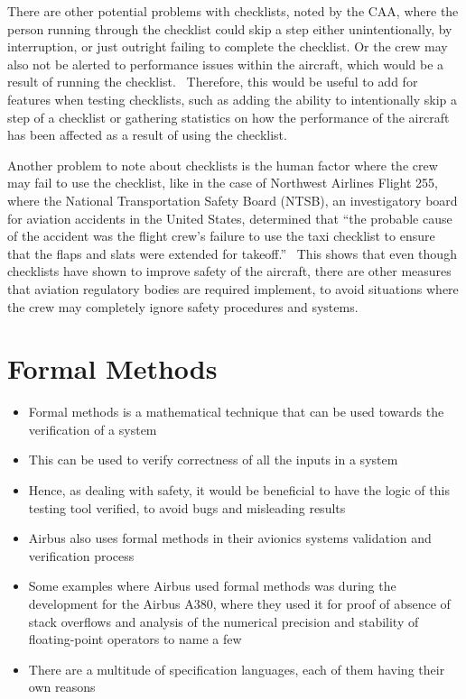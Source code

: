 \documentclass[../dissertation.tex]{subfiles}
\begin{document}
There are other potential problems with checklists,
noted by the CAA, where the person running through the checklist could skip a step
either unintentionally, by interruption, or just outright failing to complete the
checklist. Or the crew may also not be alerted to performance issues within the aircraft,
which would be a result of running the checklist.~\cite{caa:design} Therefore,
this would be useful to add for features when testing checklists, such as
adding the ability to intentionally skip a step of a checklist or gathering
statistics on how the performance of the aircraft has been affected as a result
of using the checklist.

Another problem to note about checklists is the human factor where the crew
may fail to use the checklist, like in the case of Northwest Airlines Flight 255,
where the National Transportation Safety Board (NTSB), an investigatory board
for aviation accidents in the United States, determined that
\enquote{the probable cause of the accident was the flight crew's failure
to use the taxi checklist to ensure that the flaps and slats were extended for takeoff.}~\cite{ntsb:NWA255}
This shows that even though checklists have shown to improve safety of the aircraft,
there are other measures that aviation regulatory bodies are required implement, to avoid
situations where the crew may completely ignore safety procedures and systems.


\section{Formal Methods}

\begin{itemize}
  \item Formal methods is a mathematical technique that can be used towards the
    verification of a system~\cite{nasa:formal}
  \item This can be used to verify correctness of all the inputs in a system~\cite{nasa:formal}
  \item Hence, as dealing with safety, it would be beneficial to have
    the logic of this testing tool verified, to avoid bugs and misleading results
  \item Airbus also uses formal methods in their avionics systems validation and
    verification process~\cite{airbus:formal}
  \item Some examples where Airbus used formal methods was during the development
    for the Airbus A380, where they used it for proof of absence of stack overflows
    and analysis of the numerical precision and stability of floating-point operators
    to name a few~\cite{airbus:formal}
  \item There are a multitude of specification languages, each of them
    having their own reasons %
\end{itemize}
\end{document}
